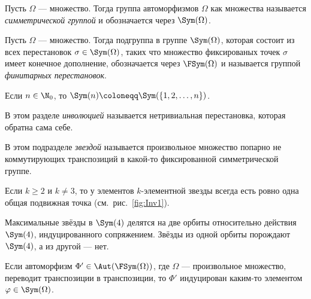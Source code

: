 \documentclass[
	extrafontsizes,
	11pt,
	hyphens,
]{memoir}
\begin{document}
\begin{definition}
Пусть \(\Omega\) --- множество. Тогда группа автоморфизмов \(\Omega\) как множества называется \emph{симметрической группой} и обозначается через \(\Sym(\Omega)\).
\end{definition}

\begin{definition}
Пусть \(\Omega\) --- множество. Тогда подгруппа в группе \(\Sym(\Omega)\), которая состоит из всех перестановок \(\sigma \in \Sym(\Omega)\), таких что множество фиксированых точек \(\sigma\) имеет конечное дополнение, обозначается через \(\FSym(\Omega)\) и называется группой \emph{финитарных перестановок}.
\end{definition}

\begin{notation}
Если  \(n \in \N_0\), то \(\Sym(n) \coloneqq \Sym(\{1, 2, \ldots, n\})\).
\end{notation}

\begin{convention}
В этом разделе \emph{инволюцией} называется нетривиальная перестановка, которая обратна сама себе.
\end{convention}

\begin{convention}
В этом подразделе \emph{звездой} называется произвольное множество попарно не коммутирующих транспозиций в ка\-кой-то фиксированной симметрической группе.
\end{convention}

\begin{observation} \label{obs:NonCommTransGen}
Если \(k \geq 2\) и \(k \neq 3\), то у элементов \(k\)-элементной звезды всегда есть ровно одна общая подвижная точка (см.\ рис.\ \ref{fig:Inv1}).
\end{observation}

\begin{observation} \label{obs:NonCommTransExc}
Максимальные звёзды в \(\Sym(4)\) делятся на две орбиты относительно действия \(\Sym(4)\), индуцированного сопряжением. Звёзды из одной орбиты порождают \(\Sym(4)\), а из другой --- нет.
\end{observation}

\begin{theorem} \label{thm:TransInner}
Если автоморфизм \(\Phi' \in \Aut(\FSym(\Omega))\),
где \(\Omega\) --- произвольное множество,
переводит транспозиции в транспозиции, то \(\Phi'\) индуцирован каким-то элементом \(\varphi \in \Sym(\Omega)\).
\end{theorem}
\end{document}
